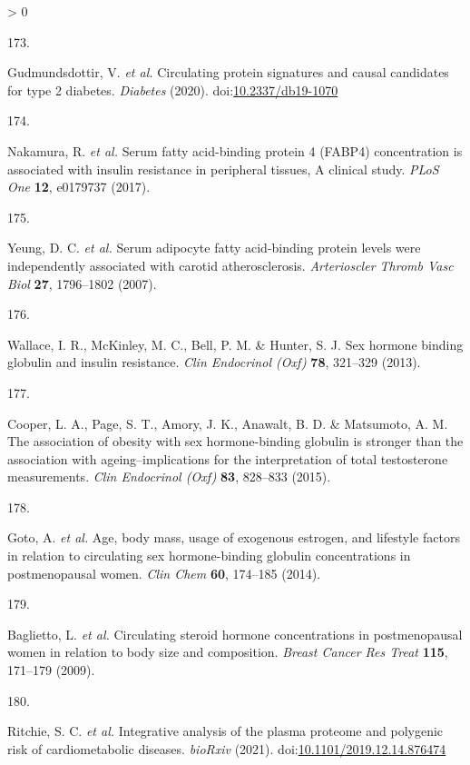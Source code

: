 \documentclass[11pt,twoside]{bristolthesis}
\newlength{\cslhangindent}
\newlength{\csllabelwidth}
\newenvironment{CSLReferences}[2] %
 {%
  \setlength{\parindent}{0pt}
  \ifodd #1 \everypar{\setlength{\hangindent}{\cslhangindent}}\ignorespaces\fi
  \ifnum #2 > 0
  \setlength{\parskip}{#2\baselineskip}
  \fi
 }%
 {}
\newcommand{\CSLLeftMargin}[1]{\parbox[t]{\csllabelwidth}{#1}}
\newcommand{\CSLRightInline}[1]{\parbox[t]{\linewidth - \csllabelwidth}{#1}\break}
\begin{document}
\begin{CSLReferences}{0}{0}
\leavevmode\hypertarget{ref-Gudmundsdottir2020}{}%
\CSLLeftMargin{173. }
\CSLRightInline{Gudmundsdottir, V. \emph{et al.} {Circulating protein signatures and causal candidates for type 2 diabetes}. \emph{Diabetes} (2020). doi:\href{https://doi.org/10.2337/db19-1070}{10.2337/db19-1070}}

\leavevmode\hypertarget{ref-Nakamura2017}{}%
\CSLLeftMargin{174. }
\CSLRightInline{Nakamura, R. \emph{et al.} {Serum fatty acid-binding protein 4 (FABP4) concentration is associated with insulin resistance in peripheral tissues, A clinical study}. \emph{PLoS One} \textbf{12}, e0179737 (2017).}

\leavevmode\hypertarget{ref-Yeung2007}{}%
\CSLLeftMargin{175. }
\CSLRightInline{Yeung, D. C. \emph{et al.} {Serum adipocyte fatty acid-binding protein levels were independently associated with carotid atherosclerosis}. \emph{Arterioscler Thromb Vasc Biol} \textbf{27}, 1796--1802 (2007).}

\leavevmode\hypertarget{ref-Wallace2013}{}%
\CSLLeftMargin{176. }
\CSLRightInline{Wallace, I. R., McKinley, M. C., Bell, P. M. \& Hunter, S. J. {Sex hormone binding globulin and insulin resistance}. \emph{Clin Endocrinol (Oxf)} \textbf{78}, 321--329 (2013).}

\leavevmode\hypertarget{ref-Cooper2015}{}%
\CSLLeftMargin{177. }
\CSLRightInline{Cooper, L. A., Page, S. T., Amory, J. K., Anawalt, B. D. \& Matsumoto, A. M. {The association of obesity with sex hormone-binding globulin is stronger than the association with ageing--implications for the interpretation of total testosterone measurements}. \emph{Clin Endocrinol (Oxf)} \textbf{83}, 828--833 (2015).}

\leavevmode\hypertarget{ref-Goto2014}{}%
\CSLLeftMargin{178. }
\CSLRightInline{Goto, A. \emph{et al.} {Age, body mass, usage of exogenous estrogen, and lifestyle factors in relation to circulating sex hormone-binding globulin concentrations in postmenopausal women}. \emph{Clin Chem} \textbf{60}, 174--185 (2014).}

\leavevmode\hypertarget{ref-Baglietto2009}{}%
\CSLLeftMargin{179. }
\CSLRightInline{Baglietto, L. \emph{et al.} {Circulating steroid hormone concentrations in postmenopausal women in relation to body size and composition}. \emph{Breast Cancer Res Treat} \textbf{115}, 171--179 (2009).}

\leavevmode\hypertarget{ref-Ritchie2019}{}%
\CSLLeftMargin{180. }
\CSLRightInline{Ritchie, S. C. \emph{et al.} {Integrative analysis of the plasma proteome and polygenic risk of cardiometabolic diseases}. \emph{bioRxiv} (2021). doi:\href{https://doi.org/10.1101/2019.12.14.876474}{10.1101/2019.12.14.876474}}


\end{CSLReferences}
\end{document}
